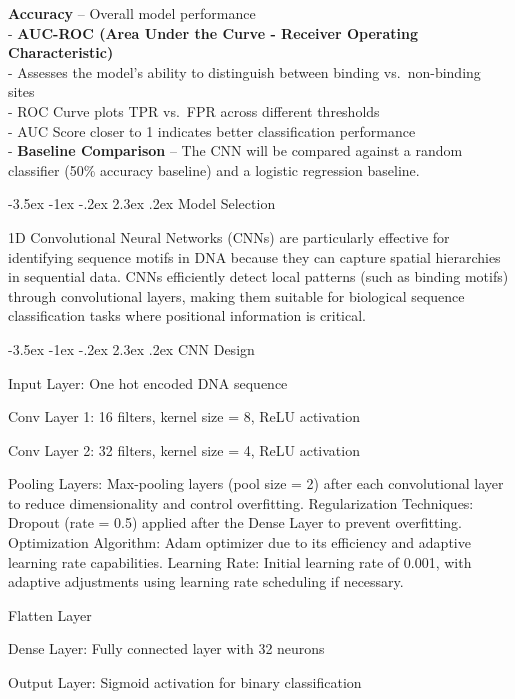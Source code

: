 \documentclass{report}
\makeatletter
\renewcommand\section{\@startsection{section}{1}{\z@}%
  {-3.5ex \@plus -1ex \@minus -.2ex}%
  {2.3ex \@plus.2ex}%
  {\normalfont\Large\bfseries}}
\makeatother
\begin{document}
\textbf{Accuracy} -- Overall model performance\\
- \textbf{AUC-ROC (Area Under the Curve - Receiver Operating
Characteristic)}\\
- Assesses the model's ability to distinguish between binding
vs.~non-binding sites\\
- ROC Curve plots TPR vs.~FPR across different thresholds\\
- AUC Score closer to 1 indicates better classification performance\\
- \textbf{Baseline Comparison} -- The CNN will be compared against a
random classifier (50\% accuracy baseline) and a logistic regression
baseline.

\section{Model Selection}\label{model-selection}

1D Convolutional Neural Networks (CNNs) are particularly effective for
identifying sequence motifs in DNA because they can capture spatial
hierarchies in sequential data. CNNs efficiently detect local patterns
(such as binding motifs) through convolutional layers, making them
suitable for biological sequence classification tasks where positional
information is critical.

\section{CNN Design}\label{cnn-design}

Input Layer: One hot encoded DNA sequence

Conv Layer 1: 16 filters, kernel size = 8, ReLU activation

Conv Layer 2: 32 filters, kernel size = 4, ReLU activation

Pooling Layers: Max-pooling layers (pool size = 2) after each
convolutional layer to reduce dimensionality and control overfitting.
Regularization Techniques: Dropout (rate = 0.5) applied after the Dense
Layer to prevent overfitting. Optimization Algorithm: Adam optimizer due
to its efficiency and adaptive learning rate capabilities. Learning
Rate: Initial learning rate of 0.001, with adaptive adjustments using
learning rate scheduling if necessary.

Flatten Layer

Dense Layer: Fully connected layer with 32 neurons

Output Layer: Sigmoid activation for binary classification
\end{document}
